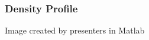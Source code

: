 \documentclass[handout]{beamer}
\begin{document}
        \begin{frame}
            \frametitle{Density Profile}

                {Image created by presenters in Matlab}

        \end{frame}
\end{document}
